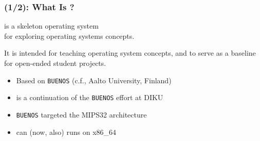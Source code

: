 \begin{frame}

\frametitle{\kudos{} (1/2): What Is \kudos{}?}

\vspace{\fill}

\begin{center}

\kudos{} is a skeleton operating system \\ for exploring operating systems
concepts.

\medskip

It is intended for teaching operating system concepts, and to serve as a
baseline for open-ended student projects.

\end{center}

\medskip

\begin{itemize}

\item Based on \texttt{BUENOS} (c.f., Aalto University, Finland)

\item \kudos{} is a continuation of the \texttt{BUENOS} effort at DIKU

\item \texttt{BUENOS} targeted the MIPS32 architecture

\item \kudos{} can (now, also) runs on x86\_64

\end{itemize}

\vspace{\fill}

\end{frame}


